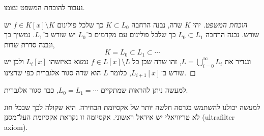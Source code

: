 נעבור להוכחת המשפט עצמו.
\begin{proof}[הוכחת המשפט]
	יהי $K$ שדה, נבנה הרחבה $K \subset L_0$ כך שלכל פולינום $f \in K[x] \setminus K$ יש שורש.
	נבנה הרחבה $L_0 \subset L_1$ כך שלכל פולינום עם מקדמים ב־$L_0$ יש שורש ב־$L_1$.
	נמשיך כך ונבנה סדרת שדות,
	\[
		K = L_0 \subset L_1 \subset \cdots
	\]
	ונגדיר את $L = \bigcup_{i = 0}^\infty L_i$, זהו שדה שכן כל $f \in L[x] \setminus L$ נמצא באיזשהו $L_i[x]$ ולכן יש שורש ב־$L_{i + 1}[x]$,
	כלומר $L$ הוא שדה סגור אלגברית כפי שרצינו.
\end{proof}
\begin{remark}
	למעשה ניתן להראות שמתקיים $L_0 = L_1 = \cdots$, כבר סגור אלגברית.
\end{remark}
\begin{remark}
	למעשה יכולנו להשתמש בגרסה חלשה יותר של אקסיומת הבחירה.
	היא שקולה לכך שבכל חוג לא טריוויאלי יש אידאל ראשוני.
	אקסיומה זו נקראת אקסיומת העל־מסנן (ultrafilter axiom).
\end{remark}

